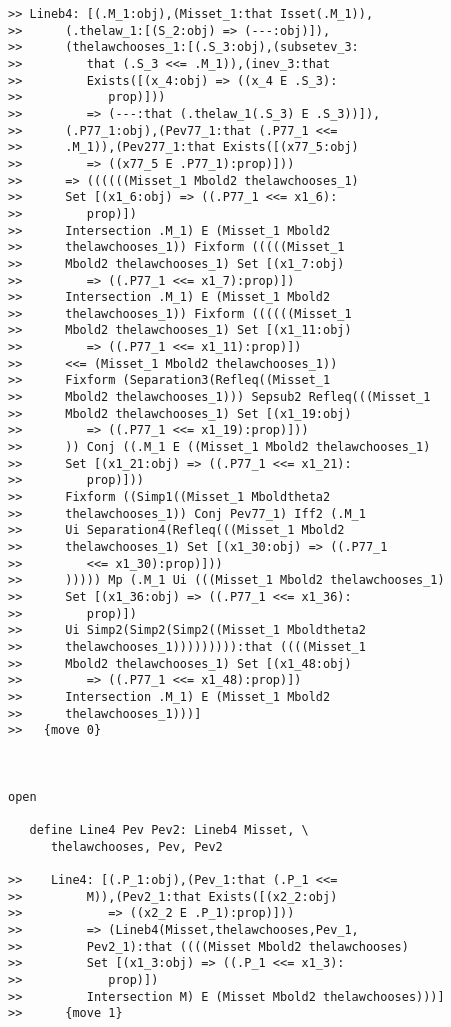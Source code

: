 \documentclass[12pt]{article}
\begin{document}
\begin{verbatim}
>> Lineb4: [(.M_1:obj),(Misset_1:that Isset(.M_1)),
>>      (.thelaw_1:[(S_2:obj) => (---:obj)]),
>>      (thelawchooses_1:[(.S_3:obj),(subsetev_3:
>>         that (.S_3 <<= .M_1)),(inev_3:that
>>         Exists([(x_4:obj) => ((x_4 E .S_3):
>>            prop)]))
>>         => (---:that (.thelaw_1(.S_3) E .S_3))]),
>>      (.P77_1:obj),(Pev77_1:that (.P77_1 <<=
>>      .M_1)),(Pev277_1:that Exists([(x77_5:obj)
>>         => ((x77_5 E .P77_1):prop)]))
>>      => ((((((Misset_1 Mbold2 thelawchooses_1)
>>      Set [(x1_6:obj) => ((.P77_1 <<= x1_6):
>>         prop)])
>>      Intersection .M_1) E (Misset_1 Mbold2
>>      thelawchooses_1)) Fixform (((((Misset_1
>>      Mbold2 thelawchooses_1) Set [(x1_7:obj)
>>         => ((.P77_1 <<= x1_7):prop)])
>>      Intersection .M_1) E (Misset_1 Mbold2
>>      thelawchooses_1)) Fixform ((((((Misset_1
>>      Mbold2 thelawchooses_1) Set [(x1_11:obj)
>>         => ((.P77_1 <<= x1_11):prop)])
>>      <<= (Misset_1 Mbold2 thelawchooses_1))
>>      Fixform (Separation3(Refleq((Misset_1
>>      Mbold2 thelawchooses_1))) Sepsub2 Refleq(((Misset_1
>>      Mbold2 thelawchooses_1) Set [(x1_19:obj)
>>         => ((.P77_1 <<= x1_19):prop)]))
>>      )) Conj ((.M_1 E ((Misset_1 Mbold2 thelawchooses_1)
>>      Set [(x1_21:obj) => ((.P77_1 <<= x1_21):
>>         prop)]))
>>      Fixform ((Simp1((Misset_1 Mboldtheta2
>>      thelawchooses_1)) Conj Pev77_1) Iff2 (.M_1
>>      Ui Separation4(Refleq(((Misset_1 Mbold2
>>      thelawchooses_1) Set [(x1_30:obj) => ((.P77_1
>>         <<= x1_30):prop)]))
>>      ))))) Mp (.M_1 Ui (((Misset_1 Mbold2 thelawchooses_1)
>>      Set [(x1_36:obj) => ((.P77_1 <<= x1_36):
>>         prop)])
>>      Ui Simp2(Simp2(Simp2((Misset_1 Mboldtheta2
>>      thelawchooses_1))))))))):that ((((Misset_1
>>      Mbold2 thelawchooses_1) Set [(x1_48:obj)
>>         => ((.P77_1 <<= x1_48):prop)])
>>      Intersection .M_1) E (Misset_1 Mbold2
>>      thelawchooses_1)))]
>>   {move 0}



open

   define Line4 Pev Pev2: Lineb4 Misset, \
      thelawchooses, Pev, Pev2

>>    Line4: [(.P_1:obj),(Pev_1:that (.P_1 <<=
>>         M)),(Pev2_1:that Exists([(x2_2:obj)
>>            => ((x2_2 E .P_1):prop)]))
>>         => (Lineb4(Misset,thelawchooses,Pev_1,
>>         Pev2_1):that ((((Misset Mbold2 thelawchooses)
>>         Set [(x1_3:obj) => ((.P_1 <<= x1_3):
>>            prop)])
>>         Intersection M) E (Misset Mbold2 thelawchooses)))]
>>      {move 1}




\end{verbatim}
\end{document}
